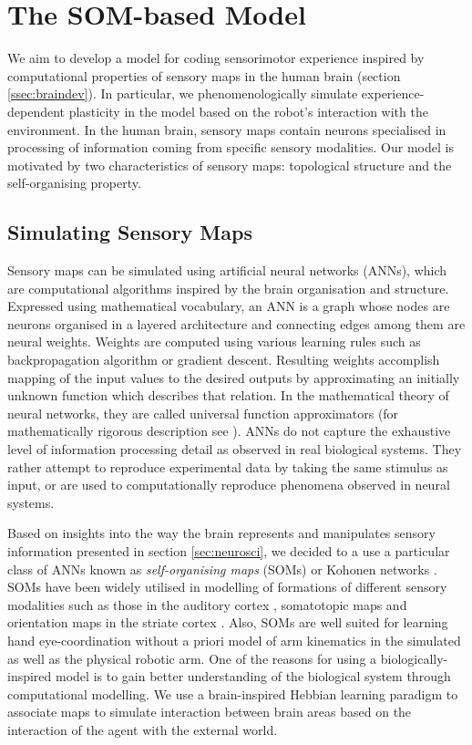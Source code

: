 \section{The SOM-based Model}
\label{sec:themodel}

We aim to develop a model for coding sensorimotor experience inspired by computational properties of sensory maps in the human brain (section \ref{ssec:braindev}). In particular, we phenomenologically simulate experience-dependent plasticity in the model based on the robot's interaction with the environment. In the human brain, sensory maps contain neurons specialised in processing of information coming from specific sensory modalities. Our model is motivated by two characteristics of sensory maps: topological structure and the self-organising property. 

\subsection{Simulating Sensory Maps}
\label{sec:simsensmaps}

Sensory maps can be simulated using artificial neural networks (ANNs), which are 
computational algorithms inspired by the brain organisation and structure. 
Expressed using mathematical vocabulary, an ANN is a graph whose nodes are 
neurons organised in a layered architecture and connecting edges among them are 
neural weights. Weights are computed using various learning rules such as 
backpropagation algorithm or gradient descent. Resulting weights accomplish 
mapping of the input values to the desired outputs by approximating an initially 
unknown function which describes that relation.
In the mathematical theory of neural networks, they are called universal function approximators (for mathematically rigorous description see \citep{Kurt1991251}).
ANNs do not capture the exhaustive level of information processing detail as observed in real biological systems. They rather attempt to reproduce experimental data by taking the same stimulus as input, or are used to computationally reproduce phenomena observed in neural systems. 

Based on insights into the way the brain represents and manipulates sensory information presented in section \ref{sec:neurosci}, we decided to a use a particular class of ANNs known as \emph{self-organising maps} (SOMs) or Kohonen networks \citep{Kohonen}. 
SOMs have been widely utilised in modelling of formations of different sensory modalities such as those in the auditory cortex \citep{MartinezRitterSchulten1988}, somatotopic maps \citep{Obermayer:1990} and orientation maps in the striate cortex \citep{malsburg73}.
Also, SOMs are well suited for learning hand eye-coordination without a priori model of arm kinematics in the simulated \citep{Marggie94} as well as the physical \citep{Martinetz} robotic arm. 
One of the reasons for using a biologically-inspired model is to gain better 
understanding of the biological system through computational modelling. We use a 
brain-inspired Hebbian learning paradigm to associate maps to simulate 
interaction between brain areas based on the interaction of the agent with the 
external world.
 
